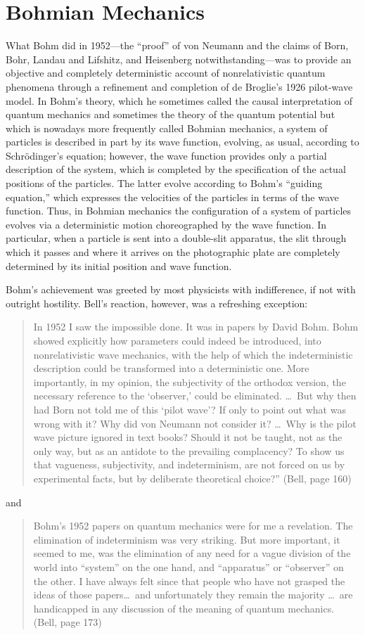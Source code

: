 \documentclass[12pt]{article}
\newcommand\bq{\begin{quotation}}
\newcommand\eq{\end{quotation}}
\begin{document}
\section*{Bohmian Mechanics}

What Bohm did in 1952---the ``proof'' of von Neumann and the claims of
Born, Bohr, Landau and Lifshitz, and Heisenberg notwithstanding---was to
provide an objective and completely deterministic account of
nonrelativistic quantum phenomena through a refinement and completion of de
Broglie's 1926 pilot-wave model.  In Bohm's theory, which he sometimes called
the causal interpretation of quantum mechanics and sometimes the theory of
the quantum potential but which is nowadays more frequently called Bohmian
mechanics,  a system of particles is described in part by its wave
function, evolving, as usual, according to Schr\"odinger's equation;
however, the wave function provides only a partial description of the
system, which is completed by the specification of the actual positions of
the particles. The latter evolve according to Bohm's ``guiding equation,''
which expresses the velocities of the particles in terms of the wave
function.  Thus, in Bohmian mechanics the configuration of a system of
particles evolves via a deterministic motion choreographed by the wave
function. In particular, when a particle is sent into a double-slit
apparatus, the slit through which it passes and where it arrives on the
photographic plate are completely determined by its initial position and
wave function.

Bohm's achievement was greeted by most physicists with indifference, if not
with outright hostility.  Bell's reaction, however, was a refreshing exception:

\bq\noindent In 1952 I saw the impossible done.  It was in papers by David
Bohm. Bohm showed explicitly how parameters could indeed be introduced,
into nonrelativistic wave mechanics, with the help of which the
indeterministic description could be transformed into a deterministic one.
More importantly, in my opinion, the subjectivity of the orthodox version,
the necessary reference to the `observer,' could be eliminated.  \dots\  But
why then had Born not told me of this `pilot wave'?  If only to point out
what was wrong with it? Why did von Neumann not consider it? \dots\  Why is the
pilot wave picture ignored in text books?  Should it not be taught, not as
the only way, but as an antidote to the prevailing complacency? To show us
that vagueness, subjectivity, and indeterminism, are not forced on us by
experimental facts, but by deliberate theoretical choice?'' (Bell, page
160)
\eq
and
\bq\noindent Bohm's 1952 papers on quantum mechanics were for me a
revelation. The elimination of indeterminism was very striking. But more
important, it seemed to me, was the elimination of any need for a vague
division of the world into ``system'' on the one hand, and ``apparatus'' or
``observer'' on the other. I have always felt since that people who have
not grasped the ideas of those papers\dots\  and unfortunately they remain the
majority \dots\  are handicapped in any discussion of the meaning of quantum
mechanics. (Bell, page 173)
\eq
\end{document}
